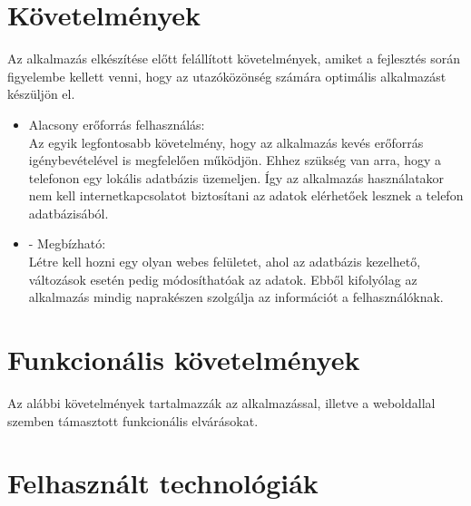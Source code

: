 

\section{Követelmények}
\label{kovetelmeny}

Az alkalmazás elkészítése előtt felállított követelmények, amiket a fejlesztés során figyelembe kellett venni, hogy az utazóközönség számára optimális alkalmazást készüljön el. 


\begin{itemize}
	\item Alacsony erőforrás felhasználás:
	\\
	Az egyik legfontosabb követelmény, hogy az alkalmazás kevés erőforrás igénybevételével is megfelelően működjön. 
	Ehhez szükség van arra, hogy a telefonon egy lokális adatbázis üzemeljen. 
	Így az alkalmazás használatakor nem kell internetkapcsolatot biztosítani az adatok elérhetőek lesznek a telefon adatbázisából.	
	\item -	Megbízható:
	\\
	Létre kell hozni egy olyan webes felületet, ahol az adatbázis kezelhető, változások esetén pedig módosíthatóak az adatok. 
	Ebből kifolyólag az alkalmazás mindig naprakészen szolgálja az információt a felhasználóknak.
	
\end{itemize}


\section{Funkcionális követelmények}
\label{funkckov}

Az alábbi követelmények tartalmazzák az alkalmazással, illetve a weboldallal szemben támasztott funkcionális elvárásokat.

\section{Felhasznált technológiák}
\label{resz3_2}


